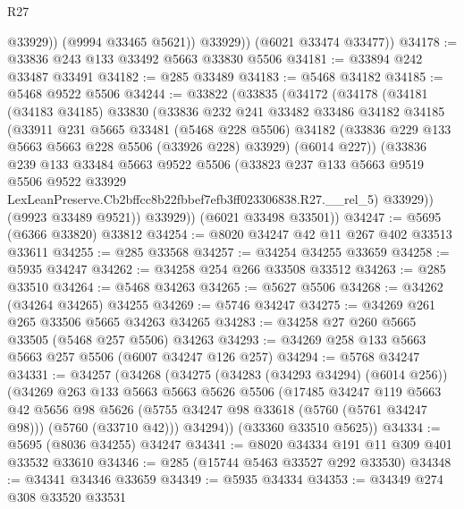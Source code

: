 \begin{lexlean}{R27}
\begin{coremodule}
                @33929))
            (@9994 @33465 @5621))
          @33929))
      (@6021 @33474 @33477))
@34178 := @33836 @243 @133 @33492 @5663 @33830 @5506
@34181 := @33894 @242 @33487 @33491
@34182 := @285 @33489
@34183 := @5468 @34182
@34185 := @5468 @9522 @5506
@34244 := @33822
    (@33835
      (@34172
        (@34178
          (@34181
            (@34183 @34185)
            @33830
            (@33836
              @232
              @241
              @33482
              @33486
              @34182
              @34185
              (@33911
                @231
                @5665
                @33481
                (@5468 @228 @5506)
                @34182
                (@33836 @229 @133 @5663 @5663 @228 @5506 (@33926 @228) @33929)
                (@6014 @227))
              (@33836
                @239
                @133
                @33484
                @5663
                @9522
                @5506
                (@33823
                  @237
                  @133
                  @5663
                  @9519
                  @5506
                  @9522
                  @33929
                  LexLeanPreserve.Cb2bffcc8b22fbbef7efb3ff023306838.R27.__rel_5)
                @33929))
            (@9923 @33489 @9521))
          @33929))
      (@6021 @33498 @33501))
@34247 := @5695 (@6366 @33820) @33812
@34254 := @8020 @34247 @42 @11 @267 @402 @33513 @33611
@34255 := @285 @33568
@34257 := @34254 @34255 @33659
@34258 := @5935 @34247
@34262 := @34258 @254 @266 @33508 @33512
@34263 := @285 @33510
@34264 := @5468 @34263
@34265 := @5627 @5506
@34268 := @34262 (@34264 @34265) @34255
@34269 := @5746 @34247
@34275 := @34269 @261 @265 @33506 @5665 @34263 @34265
@34283 := @34258 @27 @260 @5665 @33505 (@5468 @257 @5506) @34263
@34293 := @34269 @258 @133 @5663 @5663 @257 @5506 (@6007 @34247 @126 @257)
@34294 := @5768 @34247
@34331 := @34257
    (@34268
      (@34275
        (@34283 (@34293 @34294) (@6014 @256))
        (@34269
          @263
          @133
          @5663
          @5663
          @5626
          @5506
          (@17485
            @34247
            @119
            @5663
            @42
            @5656
            @98
            @5626
            (@5755 @34247 @98 @33618 (@5760 (@5761 @34247 @98)))
            (@5760 (@33710 @42)))
          @34294))
      (@33360 @33510 @5625))
@34334 := @5695 (@8036 @34255) @34247
@34341 := @8020 @34334 @191 @11 @309 @401 @33532 @33610
@34346 := @285 (@15744 @5463 @33527 @292 @33530)
@34348 := @34341 @34346 @33659
@34349 := @5935 @34334
@34353 := @34349 @274 @308 @33520 @33531

\end{coremodule}
\end{lexlean}
